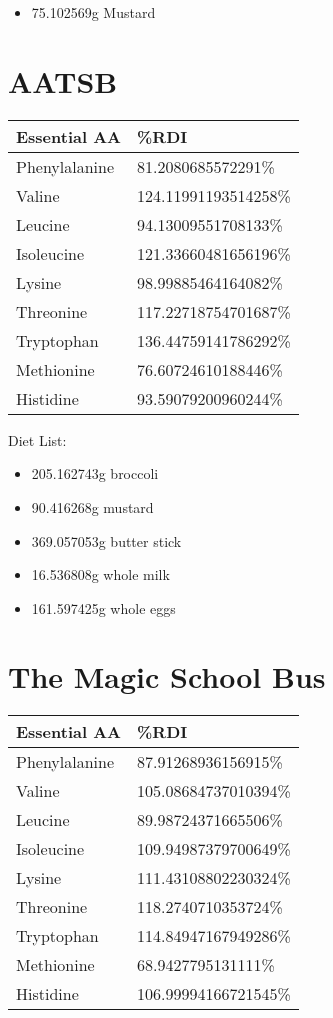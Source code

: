 \documentclass[letterpaper]{article}
\begin{document}
\begin{itemize}
\item 75.102569g Mustard
\end{itemize}

\section{AATSB}
\label{sec:orgb2e55f3}
\begin{center}
\begin{tabular}{ll}
Essential AA & \%RDI\\
\hline
Phenylalanine & 81.2080685572291\%\\
Valine & 124.11991193514258\%\\
Leucine & 94.13009551708133\%\\
Isoleucine & 121.33660481656196\%\\
Lysine & 98.99885464164082\%\\
Threonine & 117.22718754701687\%\\
Tryptophan & 136.44759141786292\%\\
Methionine & 76.60724610188446\%\\
Histidine & 93.59079200960244\%\\
\end{tabular}
\end{center}

Diet List:

\begin{itemize}
\item 205.162743g broccoli

\item 90.416268g mustard

\item 369.057053g butter stick

\item 16.536808g whole milk

\item 161.597425g whole eggs
\end{itemize}

\section{The Magic School Bus}
\label{sec:orgb597811}
\begin{center}
\begin{tabular}{ll}
Essential AA & \%RDI\\
\hline
Phenylalanine & 87.91268936156915\%\\
Valine & 105.08684737010394\%\\
Leucine & 89.98724371665506\%\\
Isoleucine & 109.94987379700649\%\\
Lysine & 111.43108802230324\%\\
Threonine & 118.2740710353724\%\\
Tryptophan & 114.84947167949286\%\\
Methionine & 68.9427795131111\%\\
Histidine & 106.99994166721545\%\\
\end{tabular}
\end{center}
\end{document}
